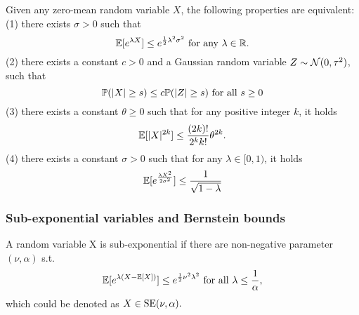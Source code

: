 \begin{theorem} Given any zero-mean random variable $X$, the following properties are equivalent: \\
(1) there exists $\sigma>0$ such that \begin{equation*}{\mathbb{E}}[e^{\lambda X}]\le e^{\frac{1}{2}\lambda^2\sigma^2}\text{ for any } \lambda\in {\mathbb{R}}.\end{equation*}
(2) there exists a constant $c>0$ and a Gaussian random variable $Z\sim{\mathcal{N}}(0,\tau^2)$, such that 
\begin{equation*}
    {\mathbb{P}}(|X|\ge s) \le c{\mathbb{P}}(|Z|\ge s) \text{ for all } s\ge 0
\end{equation*}
(3) there exists a constant $\theta\ge 0$ such that for any positive integer $k$, it holds
\begin{equation*}
    {\mathbb{E}}[|X|^{2k}] \le \frac{(2k)!}{2^kk!}\theta^{2k}.
\end{equation*}
(4) there exists a constant $\sigma>0$ such that for any $\lambda\in[0,1)$, it holds
\begin{equation*}
    {\mathbb{E}}[e^{\frac{\lambda X^2}{2\sigma^2}}]\le \frac{1}{\sqrt{1-\lambda}}
\end{equation*}
\end{theorem}

\subsubsection{Sub-exponential variables and Bernstein bounds}

\begin{definition} A random variable X is sub-exponential if there are non-negative parameter $(\nu,\alpha)$ s.t. 
\begin{equation}
    {\mathbb{E}}[e^{\lambda(X-{\mathbb{E}}[X])}] \le e^{\frac{1}{2}\nu^2\lambda^2}\text{ for all }\lambda\le \frac{1}{\alpha},
\end{equation}which could be denoted as $X\in {\mathrm{SE}}{(\nu,\alpha)}.$
\end{definition}

